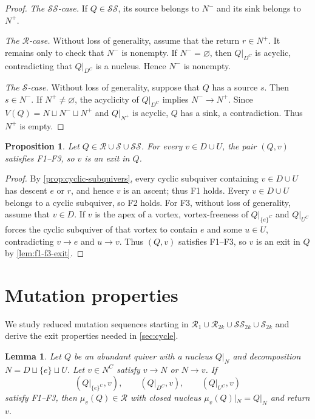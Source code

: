 \documentclass[10pt,a4paper]{amsart}
\newtheorem{proposition}[proposition]{Proposition}
\newtheorem{lemma}[lemma]{Lemma}
\theoremstyle{definition}
\theoremstyle{definition}
\numberwithin{equation}{section}
\numberwithin{table}{section}
\newcommand{\nminus}{N^{-}}
\newcommand{\nplus}{N^{+}}
\newcommand{\Rclass}{\mathcal{R}}
\newcommand{\SSclass}{\mathcal{SS}}
\newcommand{\Sclass}{\mathcal{S}}
\begin{document}
\begin{proof}
\emph{The $\SSclass$-case.} If $Q\in\SSclass$, its source belongs to $\nminus$
and its sink belongs to $\nplus$.

\emph{The $\Rclass$-case.} Without loss of generality, assume that the return
$r\in\nplus$. It remains only to check that $\nminus$ is nonempty.
If $\nminus=\varnothing$, then $Q|_{D^C}$ is acyclic,
contradicting that $Q|_{D^C}$ is a nucleus. Hence $\nminus$ is nonempty.

\emph{The $\Sclass$-case.} Without loss of generality, suppose that $Q$ has a
source $s$. Then $s\in\nminus$. If $\nplus\ne\varnothing$, the acyclicity of
$Q|_{D^C}$ implies $\nminus\to\nplus$. Since
$V(Q)=N\sqcup\nminus\sqcup\nplus$ and $Q|_{\nplus}$ is acyclic, $Q$ has a
sink, a contradiction. Thus $\nplus$ is empty.
\end{proof}

\begin{proposition}\label{prop:basic-class-mutations}
Let $Q\in\Rclass\cup\Sclass\cup\SSclass$. For every $v\in D\cup U$,
the pair $(Q,v)$ satisfies F1--F3, so $v$ is an exit in $Q$.
\end{proposition}

\begin{proof}
By \cref{prop:cyclic-subquivers}, every cyclic subquiver containing
$v\in D\cup U$ has descent $e$ or $r$, and hence $v$ is an ascent; thus F1
holds. Every $v\in D\cup U$ belongs to a cyclic subquiver, so F2 holds. For F3, without loss of
generality, assume that $v\in D$.
If $v$ is the apex of a vortex, vortex-freeness of $Q|_{\{e\}^C}$ and
$Q|_{U^C}$ forces the cyclic subquiver of that vortex to contain
$e$ and some $u\in U$,
contradicting $v\to e$ and $u\to v$.
Thus $(Q,v)$ satisfies F1--F3, so $v$ is an exit in $Q$ by
\cref{lem:f1-f3-exit}.
\end{proof}


\section{Mutation properties}\label{sec:mutation-properties}

We study reduced mutation sequences starting in
$\Rclass_1\cup\Rclass_{2k}\cup\SSclass_{2k}\cup\Sclass_{2k}$ and derive
the exit properties needed in \cref{sec:cycle}.

\begin{lemma}\label{lem:mutation-to-r}
Let $Q$ be an abundant quiver with a nucleus $Q|_N$ and decomposition
$N=D\sqcup\{e\}\sqcup U$.
Let $v\in N^C$ satisfy $v\to N$ or $N\to v$. If
\[
 (Q|_{\{e\}^C},v),\qquad
 (Q|_{D^C},v),\qquad
 (Q|_{U^C},v)
\]
satisfy F1--F3, then $\mu_v(Q)\in\Rclass$ with closed nucleus
$\mu_v(Q)|_N=Q|_N$ and return $v$.
\end{lemma}
\end{document}
